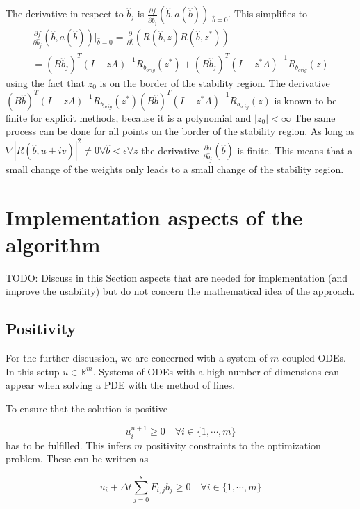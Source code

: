 \documentclass[a4paper]{article}
\numberwithin{equation}{section}
\theoremstyle{plain}
\theoremstyle{definition}
\numberwithin{theorem}{section}
\newcommand{\R}{\mathbb{R}}
\newcommand{\dt}{{\Delta t}}
\newcommand{\1}{\mathbbm{1}}
\begin{document}
The derivative in respect to $\hat{b}_j$ is 
$ \frac{\partial f}{\partial \hat{b}_j}(\hat{b},a(\hat{b})) \Big|_{\hat{b}=0}$.
This simplifies to 
\begin{multline}\label{eq:derivative_to_b}
 \frac{\partial f}{\partial \hat{b}_j}(\hat{b},a(\hat{b})) \Big|_{\hat{b}=0} = 
 \frac{\partial }{\partial \hat{b}}(R(\hat{b},z)R(\hat{b},z^*)) \\
 = (B\hat{b}_j)^T (I-zA)^{-1} R_{b_{orig}}(z^*) + (B\hat{b}_j)^T (I-z^*A)^{-1} R_{b_{orig}}(z)
\end{multline}
using the fact that $z_0$ is on the border of the stability region.
The derivative $(B\hat{b})^T (I-zA)^{-1} R_{b_{orig}}(z^*) (B\hat{b})^T (I-z^*A)^{-1} R_{b_{orig}}(z)$ is known to be finite for explicit methods, because it is a polynomial and $|z_0| < \infty$
The same process can be done for all points on the border of the stability region. 
As long as $\nabla|R(\hat{b},u+iv)|^2 \neq 0 \forall \hat{b} < \epsilon  \forall z$ the derivative $\frac{\partial a}{\partial \hat{b}_j} (\hat{b})$ is finite. This means that a small change of the weights only leads to a small change of the stability region.


\section{Implementation aspects of the algorithm}\label{sec:imple}

TODO: Discuss in this Section aspects that are needed for implementation (and improve the usability) but do not concern the mathematical idea of the approach.

\subsection{Positivity}


For the further discussion, we are concerned with a system of $m$ coupled ODEs. 
In this setup $u \in \R^m$.
Systems of ODEs with a high number of dimensions can appear when solving a PDE with the method of lines.

To ensure that the solution is positive 

\begin{equation}
 u_i^{n+1} \geq 0   \quad   \forall {i \in \{1, \cdots,m \}}  
\end{equation}
has to be fulfilled.
This infers $m$ positivity constraints to the optimization problem. These can be written as

\begin{equation}
u_i + \dt \sum_{j=0}^s F_{i,j}  b_j \geq 0 \quad \forall {i \in \{1, \cdots,m \}}  
\end{equation}
\end{document}
